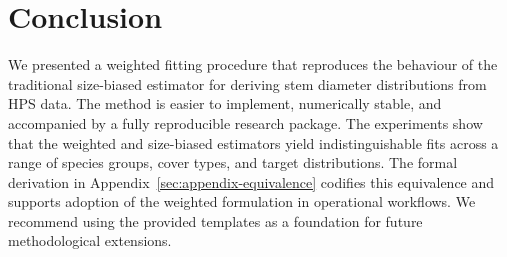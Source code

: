 \section{Conclusion}

We presented a weighted fitting procedure that reproduces the behaviour of the
traditional size-biased estimator for deriving stem diameter distributions from
HPS data. The method is easier to implement, numerically stable, and accompanied
by a fully reproducible research package. The experiments show that the
weighted and size-biased estimators yield indistinguishable fits across a range
of species groups, cover types, and target distributions. The formal derivation in
Appendix~\ref{sec:appendix-equivalence} codifies this equivalence and supports
adoption of the weighted formulation in operational workflows. We recommend
using the provided templates as a foundation for future methodological
extensions.
